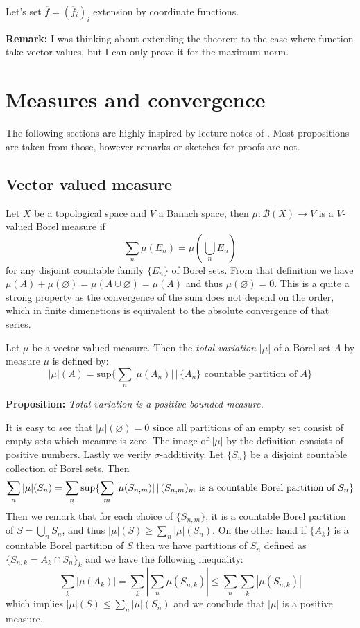 \documentclass{article}
\begin{document}
\vspace{1ex}
Let's set $\overline f = (\overline f_i)_i$ extension by coordinate functions. 

\vspace{1ex}
\textbf{Remark:} I was thinking about extending the theorem to the case where
function take vector values, but I can only prove it for the maximum norm.

\section{Measures and convergence}

The following sections are highly inspired by lecture notes of \cite{giovanni_alberti}.
Most propositions are taken from those, however remarks or sketches for proofs
are not.

\subsection{Vector valued measure}
Let $X$ be a topological space and $V$ a Banach space, then $\mu:\mathcal{B}(X)
\rightarrow V$ is a $V$-valued Borel measure if
\[\sum_n\mu(E_n)=\mu(\bigcup_n E_n)\]
for any disjoint countable family $\{E_n\}$ of Borel sets. From that definition
we have $\mu(A)+\mu(\varnothing)=\mu(A\cup\varnothing)=\mu(A)$ and thus 
$\mu(\varnothing)=0$. This is a quite a strong property as the convergence of
the sum does not depend on the order, which in finite dimenetions is equivalent
to the absolute convergence of that series.

\vspace{1ex} Let $\mu$ be a vector valued measure. Then the \emph{total
variation} $|\mu|$ of a Borel set $A$  by measure $\mu$ is defined by:
\[|\mu|(A) = \text{sup}\{\sum_n|\mu(A_n)|\,|\,\{A_n\}\text{ countable partition of }A\}\]

\textbf{Proposition:} \textit{Total variation is a positive bounded measure.}

\vspace{1ex}
It is easy to see that $|\mu|(\varnothing)=0$ since all partitions of an empty
set consist of empty sets which measure is zero. The image of $|\mu|$ by the
definition consists of positive numbers. Lastly we verify $\sigma$-additivity.
Let $\{S_n\}$ be a disjoint countable collection of Borel sets. Then
\[ 
    \sum_n|\mu|(S_n) = \sum_n\sup\{\sum_m|\mu(S_{n,m})|\,|\,(S_{n,m})_m\text{ is a countable Borel partition of }S_n\} \\ 
\]
Then we remark that for each choice of $\{S_{n,m}\}$, it is a countable Borel
partition of $S=\bigcup_n S_n$, and thus $|\mu|(S)\geq\sum_n|\mu|(S_n)$. On the
other hand if $\{A_k\}$ is a countable Borel partition of $S$ then we have
partitions of $S_n$ defined as $\{S_{n,k}=A_k\cap S_n\}_k$ and we have the
following inequality:
\[
    \sum_k|\mu(A_k)|=\sum_k|\sum_n\mu(S_{n,k})|\leq\sum_n\sum_k|\mu(S_{n,k})|
\]
which implies $|\mu|(S)\leq\sum_n|\mu|(S_n)$ and we conclude that $|\mu|$ is a
positive measure.
\end{document}
